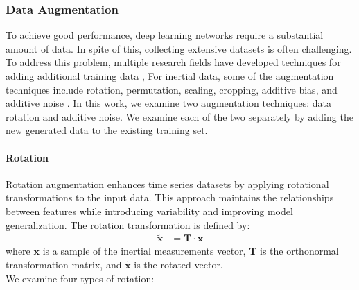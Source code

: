 \documentclass[journal]{IEEEtran}
\begin{document}
\subsubsection{Data Augmentation} \label{subsec:aug}
\noindent To achieve good performance, deep learning networks require a substantial amount of data. In spite of this, collecting extensive datasets is often challenging.  To address this problem, multiple research fields have developed techniques for adding additional training data \cite {he2016deep},
For inertial data, some of the augmentation techniques include rotation, permutation, scaling, cropping, additive bias, and additive noise \cite{um2017data}. 
In this work, we examine two augmentation techniques: data rotation and additive noise. We examine each of the two separately by adding the new generated data to the existing training set.
\paragraph{\textbf{Rotation}}
Rotation augmentation enhances time series datasets by applying rotational transformations to the input data. This approach maintains the relationships between features while introducing variability and improving model generalization. 
The rotation transformation is defined by:
\begin{align}
    \tilde{\bm{x}} &= \mathbf{T} \cdot \bm{x} \label{eq:rot} 
\end{align}
where $\bm{x}$ is a sample of the inertial measurements vector, $\mathbf{T}$ is the orthonormal transformation matrix, and $\tilde{\bm{x}}$ is the rotated vector.\\
\noindent
We examine four types of rotation:
\end{document}
